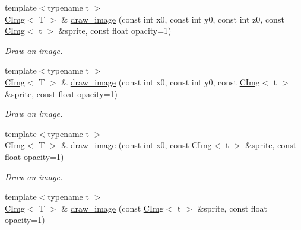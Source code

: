 \begin{DoxyCompactItemize}
\item 
\hypertarget{structcimg__library_1_1CImg_ab612f62cc2081eb707585af01a041db1}{
{\footnotesize template$<$typename t $>$ }\\\hyperlink{structcimg__library_1_1CImg}{CImg}$<$ T $>$ \& \hyperlink{structcimg__library_1_1CImg_ab612f62cc2081eb707585af01a041db1}{draw\_\-image} (const int x0, const int y0, const int z0, const \hyperlink{structcimg__library_1_1CImg}{CImg}$<$ t $>$ \&sprite, const float opacity=1)}
\label{structcimg__library_1_1CImg_ab612f62cc2081eb707585af01a041db1}

\begin{DoxyCompactList}\small\item\em Draw an image. \item\end{DoxyCompactList}\item 
\hypertarget{structcimg__library_1_1CImg_a4968cf39a15c8e55a089a1c136e331aa}{
{\footnotesize template$<$typename t $>$ }\\\hyperlink{structcimg__library_1_1CImg}{CImg}$<$ T $>$ \& \hyperlink{structcimg__library_1_1CImg_a4968cf39a15c8e55a089a1c136e331aa}{draw\_\-image} (const int x0, const int y0, const \hyperlink{structcimg__library_1_1CImg}{CImg}$<$ t $>$ \&sprite, const float opacity=1)}
\label{structcimg__library_1_1CImg_a4968cf39a15c8e55a089a1c136e331aa}

\begin{DoxyCompactList}\small\item\em Draw an image. \item\end{DoxyCompactList}\item 
\hypertarget{structcimg__library_1_1CImg_ae6fa4bcf0793823ae70d4e67be2d26a3}{
{\footnotesize template$<$typename t $>$ }\\\hyperlink{structcimg__library_1_1CImg}{CImg}$<$ T $>$ \& \hyperlink{structcimg__library_1_1CImg_ae6fa4bcf0793823ae70d4e67be2d26a3}{draw\_\-image} (const int x0, const \hyperlink{structcimg__library_1_1CImg}{CImg}$<$ t $>$ \&sprite, const float opacity=1)}
\label{structcimg__library_1_1CImg_ae6fa4bcf0793823ae70d4e67be2d26a3}

\begin{DoxyCompactList}\small\item\em Draw an image. \item\end{DoxyCompactList}\item 
\hypertarget{structcimg__library_1_1CImg_ad847e4b64a114e26dd34cea062b8c6a7}{
{\footnotesize template$<$typename t $>$ }\\\hyperlink{structcimg__library_1_1CImg}{CImg}$<$ T $>$ \& \hyperlink{structcimg__library_1_1CImg_ad847e4b64a114e26dd34cea062b8c6a7}{draw\_\-image} (const \hyperlink{structcimg__library_1_1CImg}{CImg}$<$ t $>$ \&sprite, const float opacity=1)}
\label{structcimg__library_1_1CImg_ad847e4b64a114e26dd34cea062b8c6a7}


\end{DoxyCompactItemize}
